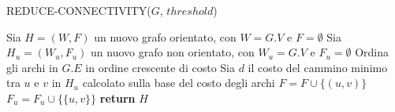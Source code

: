\begin{algorithm}[H]
    \caption{REDUCE-CONNECTIVITY($G$, $threshold$)}\label{alg:reduce-connectivity}
    \begin{algorithmic}[1]
        \State Sia $H = (W, F)$ un nuovo grafo orientato, con $W = G.V$ e $F = \emptyset$
        \State Sia $H_u = (W_u, F_u)$ un nuovo grafo non orientato, con $W_u = G.V$ e $F_u = \emptyset$
        \State Ordina gli archi in $G.E$ in ordine crescente di costo
            \State Sia $d$ il costo del cammino minimo tra $u$ e $v$ in $H_u$ calcolato sulla base del costo degli archi
                \State $F = F \cup \{(u, v)\}$
                \State $F_u = F_u \cup \{\{u, v\}\}$ 
            \EndIf
        \EndFor
        \State \textbf{return} $H$
    \end{algorithmic}
\end{algorithm}